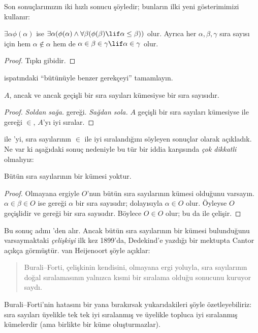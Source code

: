 Son sonuçlarımızın iki hızlı sonucu şöyledir; bunların ilki yeni gösterimimizi
kullanır:

\begin{cor}
$\exists\alpha\phi(\alpha)$ ise
$\exists\alpha(\phi(\alpha)\land\forall\beta(\phi(\beta)\lif
\alpha\leq\beta))$ olur. Ayrıca her $\alpha,\beta,\gamma$ sıra sayısı için
hem $\alpha\notin\alpha$ hem de
$\alpha\in\beta\in\gamma\lif\alpha\in\gamma$ olur.
\end{cor}

\begin{proof}
Tıpkı  gibidir.
\end{proof}

\begin{prob}
 ispatındaki ``bütünüyle benzer
gerekçeyi'' tamamlayın.
\end{prob}

\begin{cor}
$A$, ancak ve ancak geçişli bir sıra sayıları kümesiyse bir sıra sayısıdır.
\end{cor}

\begin{proof}
\emph{Soldan sağa.}  gereği. \emph{Sağdan sola.}
$A$ geçişli bir sıra sayıları kümesiyse  ile
 gereği $\in$, $A$'yı iyi sıralar.
\end{proof}

 ile 'yi, sıra sayılarının
$\in$ ile iyi sıralandığını söyleyen sonuçlar olarak açıkladık. Ne var ki
aşağıdaki sonuç nedeniyle bu tür bir iddia karşısında \emph{çok dikkatli}
olmalıyız:

\begin{thm}
Bütün sıra sayılarının bir kümesi yoktur.
\end{thm}

\begin{proof}
Olmayana ergiyle $O$'nun bütün sıra sayılarının kümesi olduğunu varsayın.
$\alpha\in\beta\in O$ ise  gereği $\alpha$ bir sıra
sayısıdır; dolayısıyla $\alpha\in O$ olur. Öyleyse $O$ geçişlidir ve
 gereği bir sıra sayısıdır. Böylece $O\in O$
olur; bu da  ile çelişir.
\end{proof}
\noindent
Bu sonuç adını \citeauthor{Burali-Forti1897}'den alır. Ancak bütün sıra
sayılarının bir kümesi bulunduğunu varsaymaktaki \emph{çelişkiyi} ilk kez
1899'da, Dedekind'e yazdığı bir mektupta Cantor açıkça görmüştür. van
Heijenoort şöyle açıklar:
\begin{quote}
  Burali--Forti, çelişkinin kendisini, olmayana ergi yoluyla, sıra
  sayılarının doğal sıralamasının yalnızca kısmi bir sıralama olduğu
  sonucunu kuruyor saydı.
  \citep[s.~105]{Heijenoort1967}
\end{quote}
Burali--Forti'nin hatasını bir yana bırakırsak yukarıdakileri şöyle
özetleyebiliriz: sıra sayıları üyelikle tek tek iyi sıralanmış ve üyelikle
topluca iyi sıralanmış kümelerdir (ama birlikte bir küme oluşturmazlar).

